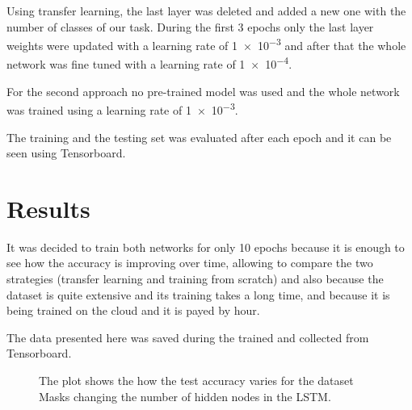 \documentclass{article}
\begin{document}
Using transfer learning, the last layer was deleted and added a new one with the number of classes of our task. During the first 3 epochs only the last layer weights were updated with a learning rate of \num{1e-3} and after that the whole network was fine tuned with a learning rate of \num{1e-4}.

For the second approach no pre-trained model was used and the whole network was trained using a learning rate of \num{1e-3}.

The training and the testing set was evaluated after each epoch and it can be seen using Tensorboard.


\section{Results}

It was decided to train both networks for only 10 epochs because it is enough to see how the accuracy is improving over time, allowing to compare the two strategies (transfer learning and training from scratch) and also because the dataset is quite extensive and its training takes a long time, and because it is being trained on the cloud and it is payed by hour.

The data presented here was saved during the trained and collected from Tensorboard.


\begin{figure}
    \centering
    \caption{The plot shows the how the test accuracy
        varies for the dataset Masks changing the number
        of hidden nodes in the LSTM.}
    \label{fig:test-accuracy-masks}
\end{figure}
\end{document}
